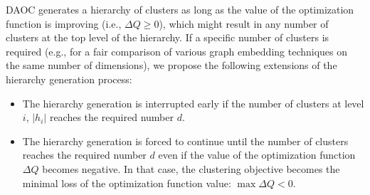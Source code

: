 \documentclass[conference]{IEEEtran}
\begin{document}
DAOC generates a hierarchy of clusters as long as the value of the optimization function is improving (i.e., $\Delta Q \ge 0$), which might result in any number of clusters at the top level of the hierarchy.
If a specific number of clusters is required (e.g., for a fair comparison of various graph embedding techniques on the same number of dimensions), we propose the following extensions of the hierarchy generation process:
\begin{itemize}\item The hierarchy generation is interrupted early if the number of clusters at level $i$, $|h_i|$ reaches the required number $d$.
\item The hierarchy generation is forced to continue until the number of clusters reaches the required number $d$ even if the value of the optimization function $\Delta Q$ becomes negative. In that case, the clustering objective becomes the minimal loss of the optimization function value: $ \max \Delta Q < 0$.
\end{itemize}
\end{document}
